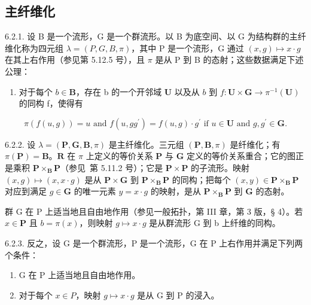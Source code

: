 \subsection{主纤维化}

6.2.1. 设 B 是一个流形，G 是一个群流形。以 B 为底空间、以 G 为结构群的主纤维化称为四元组 \(\lambda = (P, G, B, \pi)\)，其中 P 是一个流形，G 通过 \((x, g) \mapsto x \cdot g\) 在其上右作用（参见第 5.12.5 号），且 \(\pi\) 是从 P 到 B 的态射；这些数据满足下述公理：

\begin{enumerate}
\def\labelenumi{(\Alph{enumi})}
\setcounter{enumi}{15}
\tightlist
\item
  对于每个 \(b \in \mathbf{B}\)，存在 b 的一个开邻域 \(\mathbf{U}\) 以及从 \(b\) 到 \(f: \mathbf{U} \times \mathbf{G} \to \pi^{-1}(\mathbf{U})\) 的同构 f，使得有
\end{enumerate}

\[
\pi (f (u, g)) = u \text {   and   } f (u, g g ^ {\prime}) = f (u, g) \cdot g ^ {\prime} \text {   if   } u \in \mathbf {U} \text {   and   } g, g ^ {\prime} \in \mathbf {G}.
\]

6.2.2. 设 \(\lambda = (\mathbf{P}, \mathbf{G}, \mathbf{B}, \pi)\) 是主纤维化。三元组 \((\mathbf{P}, \mathbf{B}, \pi)\) 是纤维化；有 \(\pi(\mathbf{P}) = \mathbf{B}\)。\(\mathbf{R}\) 在 \(\pi\) 上定义的等价关系 \(\mathbf{P}\) 与 \(\mathbf{G}\) 定义的等价关系重合；它的图正是乘积 \(\mathbf{P} \times_{\mathbf{B}} \mathbf{P}\)（参见~第 5.11.2 号）；它是 \(\mathbf{P} \times \mathbf{P}\) 的子流形。映射 \((x, g) \mapsto (x, x \cdot g)\) 是从 \(\mathbf{P} \times \mathbf{G}\) 到 \(\mathbf{P} \times_{\mathbf{B}} \mathbf{P}\) 的同构；把每个 \((x, y) \in \mathbf{P} \times_{\mathbf{B}} \mathbf{P}\) 对应到满足 \(g \in \mathbf{G}\) 的唯一元素 \(y = x \cdot g\) 的映射，是从 \(\mathbf{P} \times_{\mathbf{B}} \mathbf{P}\) 到 \(\mathbf{G}\) 的态射。

群 G 在 P 上适当地且自由地作用（参见一般拓扑，第 III 章，第 3 版，§ 4）。若 \(x \in \mathbf{P}\) 且 \(b = \pi(x)\)，则映射 \(g \mapsto x \cdot g\) 是从群流形 G 到 b 上纤维的同构。

6.2.3. 反之，设 G 是一个群流形，P 是一个流形，G 在 P 上右作用并满足下列两个条件：

\begin{enumerate}
\def\labelenumi{(\alph{enumi})}
\item
  G 在 P 上适当地且自由地作用。
\item
  对于每个 \(x \in P\)，映射 \(g \mapsto x \cdot g\) 是从 G 到 P 的浸入。
\end{enumerate}

